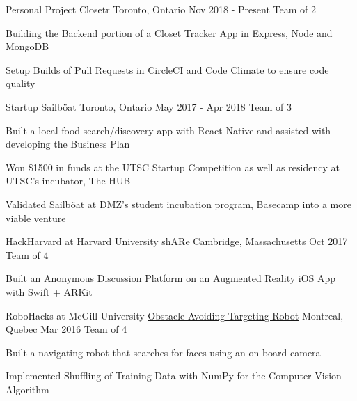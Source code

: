 \begin{cventries}
\cventry
    {Personal Project}
    {Closetr}
    {Toronto, Ontario}
    {Nov 2018 - Present}
    {Team of 2}
    {
      \begin{cvitems}
        \item{Building the Backend portion of a Closet Tracker App in Express, Node and MongoDB}
        \item{Setup Builds of Pull Requests in CircleCI and Code Climate to ensure code quality}
      \end{cvitems}
    }
\cventry
  {Startup}
  {Sailböat}
  {Toronto, Ontario}
  {May 2017 - Apr 2018}
  {Team of 3}
  {
    \begin{cvitems}
      \item {Built a local food search/discovery app with React Native and assisted with developing the Business Plan}
      \item {Won \$1500 in funds at the UTSC Startup Competition as well as residency at UTSC's incubator, The HUB}
      \item {Validated Sailböat at DMZ's student incubation program, Basecamp into a more viable venture}
    \end{cvitems}
  }
\cventry
  {HackHarvard at Harvard University}
  {shARe}
  {Cambridge, Massachusetts}
  {Oct 2017}
  {Team of 4}
  {
    \begin{cvitems}
      \item {Built an Anonymous Discussion Platform on an Augmented Reality iOS App with Swift + ARKit}
    \end{cvitems}
  }
\cventry
  {RoboHacks at McGill University}
  {\href{https://github.com/PhABC/HeadHunterBots}{Obstacle Avoiding Targeting Robot}}
  {Montreal, Quebec}
  {Mar 2016}
  {Team of 4}
  {
    \begin{cvitems}
      \item {Built a navigating robot that searches for faces using an on board camera}
      \item {Implemented Shuffling of Training Data with NumPy for the Computer Vision Algorithm}
    \end{cvitems}
  }
\end{cventries}

